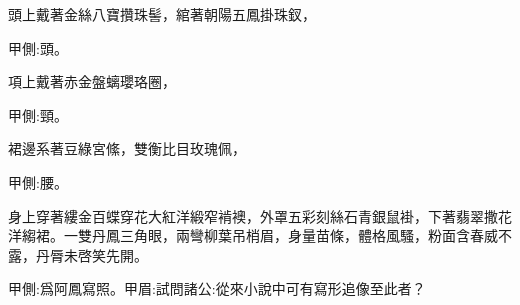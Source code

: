 \begin{qute2sp}
    頭上戴著金絲八寶攢珠髻，綰著朝陽五鳳掛珠釵，\begin{note}甲側:頭。\end{note}項上戴著赤金盤螭瓔珞圈，\begin{note}甲側:頸。\end{note}裙邊系著豆綠宮絛，雙衡比目玫瑰佩，\begin{note}甲側:腰。\end{note}身上穿著縷金百蝶穿花大紅洋緞窄褃襖，外罩五彩刻絲石青銀鼠褂，下著翡翠撒花洋縐裙。一雙丹鳳三角眼，兩彎柳葉吊梢眉，身量苗條，體格風騷，粉面含春威不露，丹脣未啓笑先開。\begin{note}甲側:爲阿鳳寫照。甲眉:試問諸公:從來小說中可有寫形追像至此者？\end{note}
\end{qute2sp}

